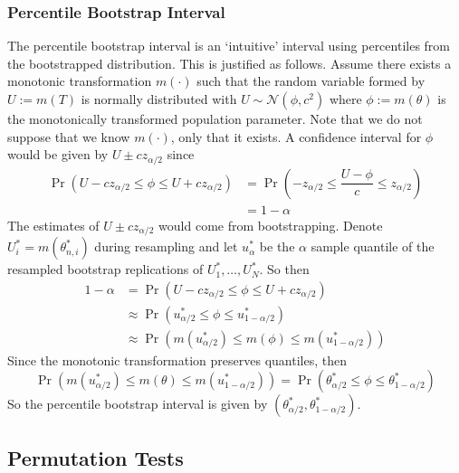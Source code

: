 \documentclass[11pt]{report} %
\begin{document}
\subsubsection{Percentile Bootstrap Interval}

The percentile bootstrap interval is an `intuitive' interval using percentiles from the bootstrapped distribution. This is justified as follows. Assume there exists a monotonic transformation $m\left(\cdot\right)$ such that the random variable formed by $U := m\left(T\right)$ is normally distributed with $U \sim \mathcal{N}\left(\phi, c^{2}\right)$ where $\phi := m\left(\theta\right)$ is the monotonically transformed population parameter. Note that we do not suppose that we know $m\left(\cdot\right)$, only that it exists. A confidence interval for $\phi$ would be given by $U \pm cz_{\alpha/2}$ since
\begin{align}
\operatorname{Pr}\left(U - cz_{\alpha/2} \leq \phi \leq U + cz_{\alpha/2}\right) &= \operatorname{Pr}\left(-z_{\alpha/2} \leq \dfrac{U - \phi}{c} \leq z_{\alpha/2}\right) \\
&= 1 - \alpha
\end{align}
The estimates of $U \pm cz_{\alpha/2}$ would come from bootstrapping. Denote $U_{i}^{*} = m\left(\theta_{n, i}^{*}\right)$ during resampling and let $u_{\alpha}^{*}$ be the $\alpha$ sample quantile of the resampled bootstrap replications of $U_{1}^{*}, \dots, U_{N}^{*}$. So then
\begin{align}
1 - \alpha &= \operatorname{Pr}\left(U - cz_{\alpha/2} \leq \phi \leq U + cz_{\alpha/2}\right) \\
&\approx \operatorname{Pr}\left(u_{\alpha/2}^{*} \leq \phi \leq u_{1 - \alpha/2}^{*}\right) \\
&\approx \operatorname{Pr}\left(m\left(u_{\alpha/2}^{*}\right) \leq m\left(\phi\right) \leq m\left(u_{1 - \alpha/2}^{*}\right)\right)
\end{align}
Since the monotonic transformation preserves quantiles, then
\begin{equation}
\operatorname{Pr}\left(m\left(u_{\alpha/2}^{*}\right) \leq m\left(\theta\right) \leq m\left(u_{1 - \alpha/2}^{*}\right)\right) = \operatorname{Pr}\left(\theta_{\alpha/2}^{*} \leq \phi \leq \theta_{1 - \alpha/2}^{*}\right)
\end{equation}
So the percentile bootstrap interval is given by $\left(\theta_{\alpha/2}^{*}, \theta_{1 - \alpha/2}^{*}\right)$.

\subsection{Permutation Tests}
\end{document}
